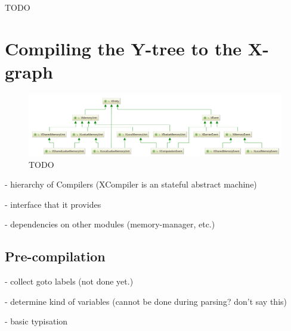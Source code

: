 TODO


\section{Compiling the Y-tree to the X-graph}
\label{ch:impl:y2x}


\begin{figure}%
  \centering
  \includegraphics[width=\textwidth,height=\textheight,keepaspectratio]{img/my/class-diagrams/XEntity.png}
  \caption{TODO}
  \label{fig:class-diagrams:XEntity}
\end{figure}







- hierarchy of Compilers (XCompiler is an stateful abstract machine)

- interface that it provides

- dependencies on other modules (memory-manager, etc.)


\subsection{Pre-compilation}
\label{ch:impl:y2x:precomp}

- collect goto labels (not done yet.)

- determine kind of variables (cannot be done during parsing? don't say this)

- basic typisation



